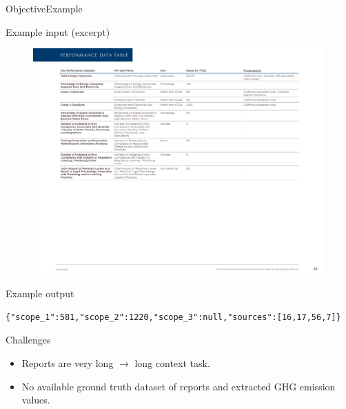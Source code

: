 \documentclass{beamer}
\begin{document}
\begin{frame}[fragile=singleslide]{Objective}{Example}
	

	\begin{block}{Example input (excerpt)}
   \begin{figure}[h]
	\includegraphics[width=\textwidth, trim={0 {5\textheight} 0 0}, clip]{graphics/example-report-page}
\end{figure}
\end{block}
	\begin{block}{Example output}
	\tiny
	\begin{lstlisting}
{"scope_1":581,"scope_2":1220,"scope_3":null,"sources":[16,17,56,7]}
	\end{lstlisting}
\end{block}

\end{frame}

\begin{frame}{Challenges}

\begin{itemize}
\item Reports are very long $\rightarrow$ long context task.
\item No available ground truth dataset of reports and extracted GHG emission values.
\end{itemize}
\end{frame}
\end{document}

